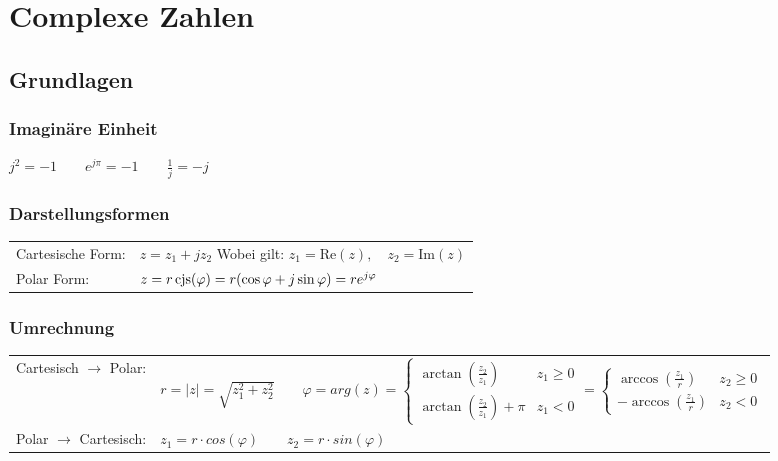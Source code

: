 \section{Complexe Zahlen}
\subsection{Grundlagen}
\subsubsection{Imaginäre Einheit}
$j^2 = -1 \qquad e^{j\pi} = -1 \qquad \frac{1}{j} = -j$

\subsubsection{Darstellungsformen}
\begin{tabular}{ll}
	Cartesische Form: & $z = z_1 + j z_2$ \quad Wobei gilt: $z_1 = \text{Re}(z),
	\quad z_2 = \text{Im}(z)$ \\
	Polar Form: &   $z = r \operatorname{cjs}(\varphi) = r(\cos{\varphi} + j\sin{\varphi}) = r
	e^{j \varphi}$ 	\\
\end{tabular}
\subsubsection{Umrechnung}
\begin{tabular}{ll}
	Cartesisch $\rightarrow$ Polar: & $r = |z| = \sqrt{z_1^2 + z_2^2} \qquad   
		\varphi = arg(z) 
		        = 	\begin{cases} 
                       	\arctan(\frac{z_2}{z_1}) &z_1 \geq 0\\
                  		\arctan(\frac{z_2}{z_1}) + \pi &z_1 < 0
          			\end{cases}
          		=	\begin{cases}
          				\arccos(\frac{z_1}{r}) & z_2 \geq 0 \\
          				-\arccos(\frac{z_1}{r}) & z_2 < 0          		
          			\end{cases}$ \\
          			
	Polar $\rightarrow$ Cartesisch: & $z_1 = r \cdot cos(\varphi) \qquad z_2 = r
	\cdot sin(\varphi)$ \\
\end{tabular}


